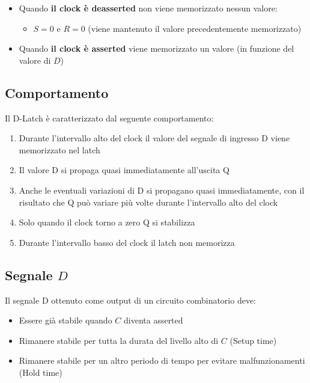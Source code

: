 \begin{center}
    \begin{itemize}
    \item Quando \textbf{il clock è deasserted} non viene memorizzato nessun valore:
    \begin{itemize}
        \item $S=0$ e $R=0$ (viene mantenuto il valore precedentemente memorizzato)
    \end{itemize}

    \item  Quando \textbf{il clock è asserted} viene memorizzato un valore (in funzione del valore di $D$)
    \end{itemize}
\end{center}

\subsection{Comportamento}
Il D-Latch è caratterizzato dal seguente comportamento:
\begin{enumerate}
    \item Durante l'intervallo alto del clock il valore del segnale di ingresso D viene memorizzato nel latch
    \item Il valore D si propaga quasi immediatamente all'uscita Q
    \item Anche le eventuali variazioni di D si propagano quasi immediatamente, con il risultato che Q può variare più volte durante l'intervallo alto del clock
    \item Solo quando il clock torno a zero Q si stabilizza
    \item Durante l'intervallo basso del clock il latch non memorizza
\end{enumerate}

\subsection{Segnale $D$}
Il segnale D ottenuto come output di un circuito combinatorio deve:
\begin{itemize}
    \item Essere già stabile quando $C$ diventa asserted
    \item Rimanere stabile per tutta la durata del livello alto di $C$ (Setup time)
    \item Rimanere stabile per un altro periodo di tempo per evitare malfunzionamenti (Hold time)
\end{itemize}

